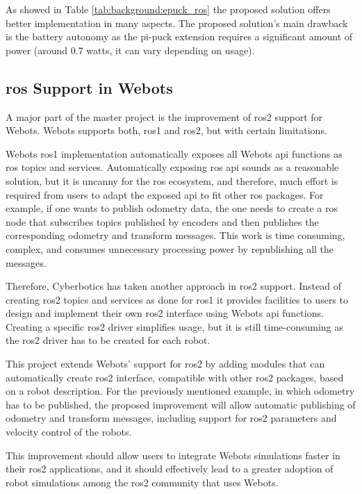 As showed in Table \ref{tab:background:epuck_ros} the proposed solution offers better implementation in many aspects.
The proposed solution's main drawback is the battery autonomy as the pi-puck extension requires a significant amount of power (around 0.7 watts, it can vary depending on usage).


\subsection{\ac{ros} Support in Webots}
A major part of the master project is the improvement of \ac{ros2} support for Webots.
Webots supports both, \ac{ros1} and \ac{ros2}, but with certain limitations.

Webots \ac{ros1} implementation automatically exposes all Webots \ac{api} functions as \ac{ros} topics and services.
Automatically exposing \ac{ros} \ac{api} sounds as a reasonable solution, but it is uncanny for the \ac{ros} ecosystem, and therefore, much effort is required from users to adapt the exposed \ac{api} to fit other \ac{ros} packages.
For example, if one wants to publish odometry data, the one needs to create a \ac{ros} node that subscribes topics published by encoders and then publishes the corresponding odometry and transform messages. This work is time consuming, complex, and consumes unnecessary processing power by republishing all the messages.

Therefore, Cyberbotics has taken another approach in \ac{ros2} support.
Instead of creating \ac{ros2} topics and services as done for \ac{ros1} it provides facilities to users to design and implement their own \ac{ros2} interface using Webots \ac{api} functions.
Creating a specific \ac{ros2} driver simplifies usage, but it is still time-consuming as the \ac{ros2} driver has to be created for each robot.

This project extends Webots' support for \ac{ros2} by adding modules that can automatically create \ac{ros2} interface, compatible with other \ac{ros2} packages, based on a robot description.
For the previously mentioned example, in which odometry has to be published, the proposed improvement will allow automatic publishing of odometry and transform messages, including support for \ac{ros2} parameters and velocity control of the robots.

This improvement should allow users to integrate Webots simulations faster in their \ac{ros2} applications, and it should effectively lead to a greater adoption of robot simulations among the \ac{ros2} community that uses Webots.
